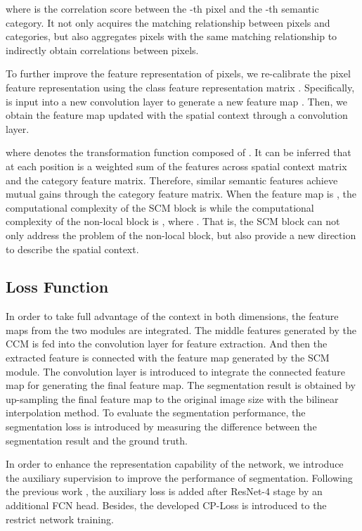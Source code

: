 \documentclass[10pt,journal,cspaper,compsoc]{IEEEtran}
\begin{document}
where  is the correlation score between the -th pixel and the -th semantic category. It not only acquires the matching relationship between pixels and categories, but also aggregates pixels with the same matching relationship to indirectly obtain correlations between pixels.
	
To further improve the feature representation of pixels, we re-calibrate the pixel feature representation using the class feature representation matrix . Specifically,  is input into a new  convolution layer to generate a new feature map . Then, we obtain the feature map  updated with the spatial context through a  convolution layer.

where  denotes the transformation function composed of . It can be inferred that  at each position is a weighted sum of the features across spatial context matrix and the category feature matrix. Therefore, similar semantic features achieve mutual gains through the category feature matrix. When the feature map is , the computational complexity of the SCM block is  while the computational complexity of the non-local block is , where . That is, the SCM block can not only address the problem of the non-local block, but also provide a new direction to describe the spatial context.
	
\subsection{Loss Function}
In order to take full advantage of the context in both dimensions, the feature maps from the two modules are integrated. The middle features generated by the CCM is fed into the convolution layer for feature extraction. And then the extracted feature is connected with the feature map generated by the SCM module. The  convolution layer is introduced to integrate the connected feature map for generating the final feature map. The segmentation result is obtained by up-sampling the final feature map to the original image size with the bilinear interpolation method. To evaluate the segmentation performance, the segmentation loss  is introduced by measuring the difference between the segmentation result and the ground truth.
	
In order to enhance the representation capability of the network, we introduce the auxiliary supervision to improve the performance of segmentation. Following the previous work \cite{chen2017rethinking, zhang2018context, zhu2019asymmetric}, the auxiliary loss  is added after ResNet-4 stage by an additional FCN head. Besides, the developed CP-Loss  is introduced to the restrict network training.
	
\end{document}
